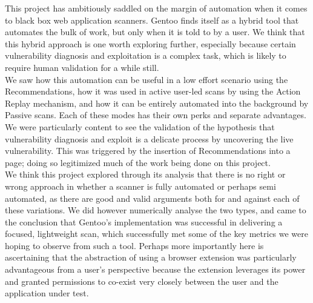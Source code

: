 This project has ambitiously saddled on the margin of automation when it comes to black box web application scanners. Gentoo finds itself as a hybrid tool that automates the bulk of work, but only when it is told to by a user. We think that this hybrid approach is one worth exploring further, especially because certain vulnerability diagnosis and exploitation is a complex task, which is likely to require human validation for a while still. \\

We saw how this automation can be useful in a low effort scenario using the Recommendations, how it was used in active user-led scans by using the Action Replay mechanism, and how it can be entirely automated into the background by Passive scans. Each of these modes has their own perks and separate advantages. We were particularly content to see the validation of the hypothesis that vulnerability diagnosis and exploit is a delicate process by uncovering the live vulnerability. This was triggered by the insertion of Recommendations into a page; doing so legitimized much of the work being done on this project. \\

We think this project explored through its analysis that there is no right or wrong approach in whether a scanner is fully automated or perhaps semi automated, as there are good and valid arguments both for and against each of these variations. We did however numerically analyse the two types, and came to the conclusion that Gentoo's implementation was successful in delivering a focused, lightweight scan, which successfully met some of the key metrics we were hoping to observe from such a tool. Perhaps more importantly here is ascertaining that the abstraction of using a browser extension was particularly advantageous from a user's perspective because the extension leverages its power and granted permissions to co-exist very closely between the user and the application under test. \\

